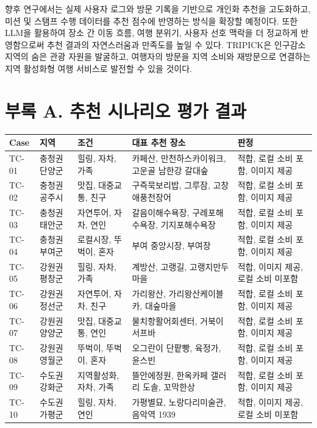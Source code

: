 \documentclass[10pt,a4paper]{article}
\begin{document}
향후 연구에서는 실제 사용자 로그와 방문 기록을 기반으로 개인화 추천을 고도화하고, 미션 및 스탬프 수행 데이터를 추천 점수에 반영하는 방식을 확장할 예정이다. 또한 LLM을 활용하여 장소 간 이동 흐름, 여행 분위기, 사용자 선호 맥락을 더 정교하게 반영함으로써 추천 결과의 자연스러움과 만족도를 높일 수 있다. TRIPICK은 인구감소지역의 숨은 관광 자원을 발굴하고, 여행자의 방문을 지역 소비와 재방문으로 연결하는 지역 활성화형 여행 서비스로 발전할 수 있을 것이다.

\section*{부록 A. 추천 시나리오 평가 결과}

\scriptsize
\setlength{\tabcolsep}{3pt}
\renewcommand{\arraystretch}{1.25}

\begin{longtable}{|p{10mm}|p{18mm}|p{31mm}|p{58mm}|p{31mm}|}
\hline
Case & 지역 & 조건 & 대표 추천 장소 & 판정 \\
\hline
TC-01 & 충청권 단양군 & 힐링, 자차, 가족 & 카페산, 만천하스카이워크, 고운골 남한강 갈대숲 & 적합, 로컬 소비 포함, 이미지 제공 \\
\hline
TC-02 & 충청권 공주시 & 맛집, 대중교통, 친구 & 구즉묵보리밥, 그루잠, 고창애풍천장어 & 적합, 로컬 소비 포함, 이미지 제공 \\
\hline
TC-03 & 충청권 태안군 & 자연투어, 자차, 연인 & 갈음이해수욕장, 구례포해수욕장, 기지포해수욕장 & 적합, 로컬 소비 포함, 이미지 제공 \\
\hline
TC-04 & 충청권 부여군 & 로컬시장, 뚜벅이, 혼자 & 부여 중앙시장, 부여장 & 적합, 로컬 소비 포함, 이미지 제공 \\
\hline
TC-05 & 강원권 평창군 & 힐링, 자차, 가족 & 계방산, 고랭길, 고랭지만두마을 & 적합, 이미지 제공, 로컬 소비 미포함 \\
\hline
TC-06 & 강원권 정선군 & 자연투어, 자차, 친구 & 가리왕산, 가리왕산케이블카, 대숲마을 & 적합, 로컬 소비 포함, 이미지 제공 \\
\hline
TC-07 & 강원권 양양군 & 맛집, 대중교통, 연인 & 물치항활어회센터, 거북이서프바 & 적합, 로컬 소비 포함, 이미지 제공 \\
\hline
TC-08 & 강원권 영월군 & 뚜벅이, 뚜벅이, 혼자 & 오그란이 단팥빵, 육정가, 윤스빈 & 적합, 로컬 소비 포함, 이미지 제공 \\
\hline
TC-09 & 수도권 강화군 & 지역활성화, 자차, 가족 & 뜰안에정원, 한옥카페 갤러리 도솔, 꼬막한상 & 적합, 로컬 소비 포함, 이미지 제공 \\
\hline
TC-10 & 수도권 가평군 & 힐링, 자차, 연인 & 가평별묘, 노랑다리미술관, 음악역 1939 & 적합, 이미지 제공, 로컬 소비 미포함 \\

\end{longtable}
\end{document}
